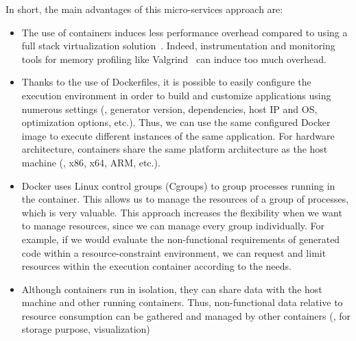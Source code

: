 In short, the main advantages of this micro-services approach are:
\begin{itemize}
	\item The use of containers induces less performance overhead compared to using a full stack virtualization solution~\cite{spoiala2016performance}. Indeed, instrumentation and monitoring tools for memory profiling like Valgrind~\cite{nethercote2007valgrind} can induce too much overhead.
	\item Thanks to the use of Dockerfiles, it is possible to easily configure the execution environment in order to build and customize applications using numerous settings (\eg, generator version, dependencies, host IP and OS, optimization options, etc.). Thus, we can use the same configured Docker image to execute different instances of the same application. For hardware architecture, containers share the same platform architecture as the host machine (\eg, x86, x64, ARM, etc.). 
	\item Docker uses Linux control groups (Cgroups) to group processes running in the container. This allows us to manage the resources of a group of processes, which is very valuable. 
	This approach increases the flexibility when we want to manage resources, since we can manage every group individually. For example, if we would evaluate the non-functional requirements of generated code within a resource-constraint environment, we can  request and limit resources within the execution container according to the needs.
	\item Although containers run in isolation, they can share data with the host machine and other running containers. Thus, non-functional data relative to resource consumption can be gathered and managed by other containers (\ie, for storage purpose, visualization)
\end{itemize}




